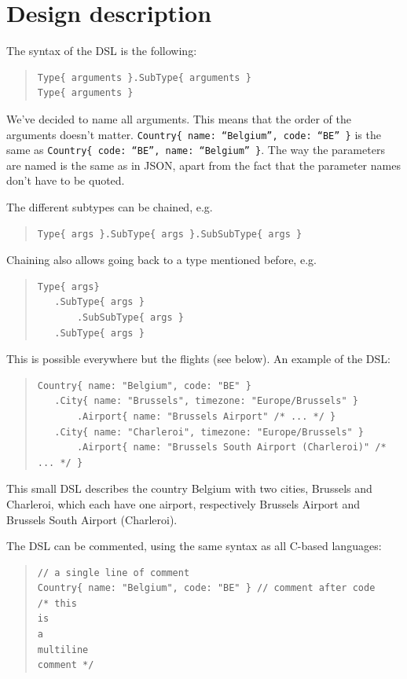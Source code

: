 \documentclass[a4paper,11pt]{article}
\newcommand{\npar}{\par \vspace{2.3ex plus 0.3ex minus 0.3ex} \noindent}
\newcommand{\dslcode}[1]{\texttt{#1}}
\begin{document}
\newpage
\section{Design description}
The syntax of the DSL is the following:
\begin{quote}
\begin{verbatim}    
Type{ arguments }.SubType{ arguments }		
Type{ arguments }
\end{verbatim}
\end{quote}

We've decided to name all arguments. This means that the order of the arguments doesn't matter. \dslcode{Country\{ name: ``Belgium'', code: ``BE'' \}} is the same as \dslcode{Country\{ code: ``BE'', name: ``Belgium'' \}}. The way the parameters are named is the same as in JSON, apart from the fact that the parameter names don't have to be quoted.

The different subtypes can be chained, e.g.
\begin{quote}\begin{verbatim}
Type{ args }.SubType{ args }.SubSubType{ args }
\end{verbatim}\end{quote}

Chaining also allows going back to a type mentioned before, e.g.
\begin{quote}\begin{verbatim}
Type{ args}
   .SubType{ args }
       .SubSubType{ args }
   .SubType{ args }
\end{verbatim}\end{quote}

This is possible everywhere but the flights (see below).
An example of the DSL:
\begin{quote}\begin{verbatim}
Country{ name: "Belgium", code: "BE" }
   .City{ name: "Brussels", timezone: "Europe/Brussels" }
       .Airport{ name: "Brussels Airport" /* ... */ }
   .City{ name: "Charleroi", timezone: "Europe/Brussels" }
       .Airport{ name: "Brussels South Airport (Charleroi)" /* ... */ }
\end{verbatim}\end{quote}

This small DSL describes the country Belgium with two cities, Brussels and Charleroi, which each have one airport, respectively Brussels Airport and Brussels South Airport (Charleroi).

\npar The DSL can be commented, using the same syntax as all C-based languages:
\begin{quote}\begin{verbatim}
// a single line of comment
Country{ name: "Belgium", code: "BE" } // comment after code
/* this
is
a
multiline
comment */
\end{verbatim}\end{quote}
\end{document}
